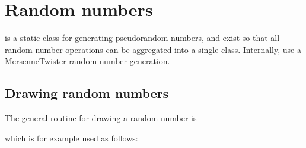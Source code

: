 \documentclass[letterpaper,10pt,english]{sphinxmanual}
\begin{document}
\section{Random numbers}
\label{\detokenize{Utilities/RandomNumbers:random-numbers}}\label{\detokenize{Utilities/RandomNumbers:chap-random}}\label{\detokenize{Utilities/RandomNumbers::doc}}
 is a static class for generating pseudo\sphinxhyphen{}random numbers, and exist so that all random number operations can be aggregated into a single class.
Internally,  use a Mersenne\sphinxhyphen{}Twister random number generation.


\subsection{Drawing random numbers}
\label{\detokenize{Utilities/RandomNumbers:drawing-random-numbers}}
The general routine for drawing a random number is

\begin{sphinxVerbatim}[commandchars=\\\{\},formatcom=\scriptsize]
 
  
\end{sphinxVerbatim}

which is for example used as follows:

\begin{sphinxVerbatim}[commandchars=\\\{\},formatcom=\scriptsize]
  

    
\end{sphinxVerbatim}
\end{document}
